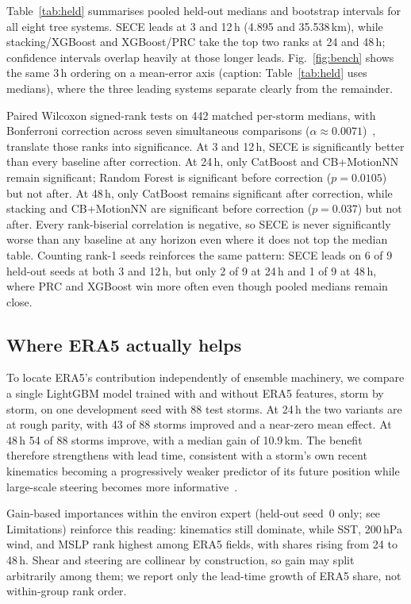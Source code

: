 \documentclass[conference]{IEEEtran}
\newcommand{\sece}{SECE}
\newcommand{\era}{ERA5}
\begin{document}
Table~\ref{tab:held} summarises pooled held-out medians and bootstrap intervals
for all eight tree systems. \sece{} leads at 3 and 12\,h (4.895 and 35.538\,km),
while stacking/XGBoost and XGBoost/PRC take the top two ranks at 24 and 48\,h;
confidence intervals overlap heavily at those longer leads. Fig.~\ref{fig:bench}
shows the same 3\,h ordering on a mean-error axis (caption: Table~\ref{tab:held}
uses medians), where the three leading systems separate clearly from the remainder.

Paired Wilcoxon signed-rank tests on 442 matched per-storm medians, with
Bonferroni correction across seven simultaneous comparisons ($\alpha \approx
0.0071$)~\cite{wilcoxon1945,bonferroni1936},
translate those ranks into significance. At 3 and 12\,h, \sece{} is significantly
better than every baseline after correction. At 24\,h, only CatBoost and
CB+MotionNN remain significant; Random Forest is significant before correction
($p=0.0105$) but not after. At 48\,h, only CatBoost remains significant after
correction, while stacking and CB+MotionNN are significant before correction
($p=0.037$) but not after. Every rank-biserial correlation is negative, so
\sece{} is never significantly worse than any baseline at any horizon even where
it does not top the median table. Counting rank-1 seeds reinforces the same
pattern: \sece{} leads on 6 of 9 held-out seeds at both 3 and 12\,h, but only
2 of 9 at 24\,h and 1 of 9 at 48\,h, where PRC and XGBoost win more often even
though pooled medians remain close.

\subsection{Where ERA5 actually helps}
To locate \era{}'s contribution independently of ensemble machinery, we compare a
single LightGBM model trained with and without \era{} features, storm by storm,
on one development seed with 88 test storms. At 24\,h the two variants are at
rough parity, with 43 of 88 storms improved and a near-zero mean effect. At 48\,h
54 of 88 storms improve, with a median gain of 10.9\,km. The benefit therefore
strengthens with lead time, consistent with a storm's own recent kinematics
becoming a progressively weaker predictor of its future position while
large-scale steering becomes more
informative~\cite{giffard2020tropical,goerss2004tropical}.

Gain-based importances within the environ expert (held-out seed~0 only; see
Limitations) reinforce this reading: kinematics still dominate, while SST, 200\,hPa
wind, and MSLP rank highest among \era{} fields, with shares rising from 24 to
48\,h. Shear and steering are collinear by construction, so gain may split
arbitrarily among them; we report only the lead-time growth of \era{} share, not
within-group rank order.
\end{document}
